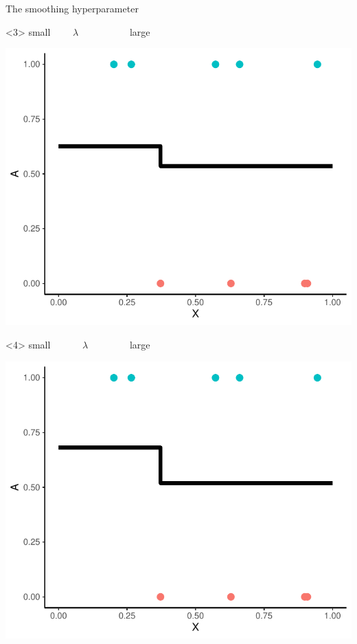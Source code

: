 \documentclass[smaller]{beamer}\usepackage{listings}
\begin{document}
\begin{frame}[label={sec:org87d521d}]{The smoothing hyperparameter}
\begin{onlyenv}<3>
\center small \(\quad \quad \lambda \quad \quad \quad \quad \quad\) large

\begin{center}
\includegraphics[width=.9\linewidth]{./hal-smoothing1.pdf}
\end{center}
\end{onlyenv}

\begin{onlyenv}<4>
\center small \(\quad \quad \quad  \lambda \quad \quad \quad \quad\) large

\begin{center}
\includegraphics[width=.9\linewidth]{./hal-smoothing2.pdf}
\end{center}
\end{onlyenv}


\end{frame}
\end{document}
